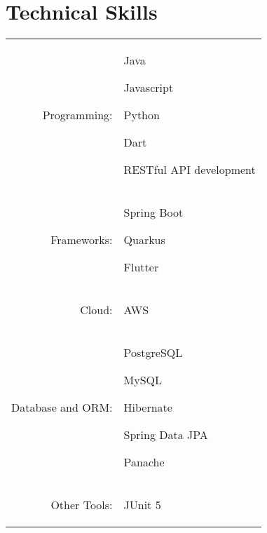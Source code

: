 \documentclass[a4paper,12pt]{article}
\begin{document}
\section{Technical Skills}
\vspace{2pt}
\begin{tabular}{rp{15.2cm}}
\raggedleft Programming:
& \begin{itemize*}[label=\Large\textbullet] %
    \item Java
    \item Javascript
    \item Python
    \item Dart
    \item RESTful API development
\end{itemize*}\\
\raggedleft Frameworks:
& \begin{itemize*}[label=\Large\textbullet]
    \item Spring Boot
    \item Quarkus
    \item Flutter
\end{itemize*}\\
\raggedleft Cloud:
& \begin{itemize*}[label=\Large\textbullet]
    \item AWS
\end{itemize*}\\
\raggedleft Database and ORM:
& \begin{itemize*}[label=\Large\textbullet]
    \item PostgreSQL
    \item MySQL
    \item Hibernate
    \item Spring Data JPA
    \item Panache
\end{itemize*}\\
\raggedleft Other Tools:
& \begin{itemize*}[label=\Large\textbullet]
    \item JUnit 5

\end{itemize*}
\end{tabular}
\end{document}
